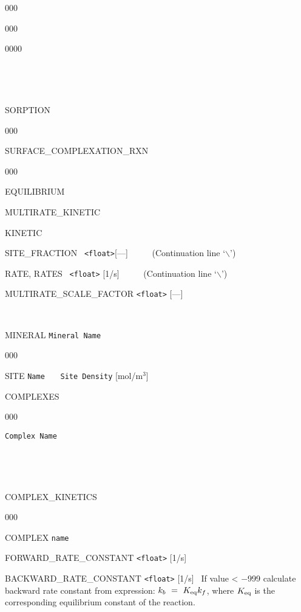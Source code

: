 \begin{deflist}{000}
\begin{deflist}{000}
\begin{deflist}{0000}
~\\

\item [\keyend]
\end{deflist}
\item [\keyend] ~

~\\

\item[SORPTION] ~

\begin{deflist}{000}
\item[SURFACE\_COMPLEXATION\_RXN] ~

\begin{deflist}{000}
\item[EQUILIBRIUM]

\item[MULTIRATE\_KINETIC]

\item[KINETIC]


\item [SITE\_FRACTION] \ {\tt <float>}[---] \ \ \ \ \ (Continuation line `$\backslash$')
\item [RATE, RATES] \ {\tt <float>} [1/s] \ \ \ \ \ (Continuation line `$\backslash$')
\item [MULTIRATE\_SCALE\_FACTOR] {\tt <float>} [---]

~\\

\item [MINERAL] {\tt Mineral Name}
\begin{deflist}{000}
\item[SITE] {\tt Name} \ \ \ {\tt Site Density} [mol/m$^3$]
\item[COMPLEXES] ~
\begin{deflist}{000}
\item[\tt Complex Name]
\end{deflist}
\item [\keyend] ~

~\\

\item[COMPLEX\_KINETICS] ~
\begin{deflist}{000}
\item[COMPLEX] {\tt name}
\item[FORWARD\_RATE\_CONSTANT] {\tt <float>} [1/s]
\item[BACKWARD\_RATE\_CONSTANT] {\tt <float>} [1/s] \ If value < $-$999 calculate backward rate constant from expression: $k_b \ =\  K_{\rm eq} k_f$, where $K_{\rm eq}$ is the corresponding equilibrium constant of the reaction.
\end{deflist}
\item [\keyend] ~
\end{deflist}
\item [\keyend] ~


\end{deflist}
\end{deflist}
\end{deflist}
\end{deflist}
